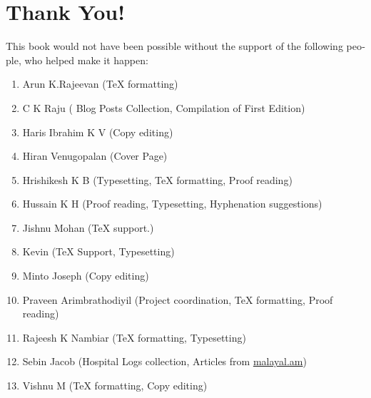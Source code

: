 \section*{Thank You!}
\begin{english}
This book would not have been possible without the support of the following 
people, who helped make it happen:
\begin{enumerate}
 \item Arun K.Rajeevan ({\TeX} formatting)
 \item C K Raju ( Blog Posts Collection, Compilation of First Edition)
 \item Haris Ibrahim K V (Copy editing)
 \item Hiran Venugopalan (Cover Page)
 \item Hrishikesh K B (Typesetting, {\TeX} formatting, Proof reading)
 \item Hussain K H (Proof reading, Typesetting, Hyphenation suggestions)
 \item Jishnu Mohan ({\TeX} support.)
 \item Kevin ({\TeX} Support, Typesetting)
 \item Minto Joseph (Copy editing)
 \item Praveen Arimbrathodiyil (Project coordination, {\TeX} formatting, Proof reading)
 \item Rajeesh K Nambiar ({\TeX} formatting, Typesetting)
 \item Sebin Jacob (Hospital Logs collection, Articles from \url{malayal.am})
 \item Vishnu M ({\TeX} formatting, Copy editing)
 
\end{enumerate}
\end{english}
\newpage
